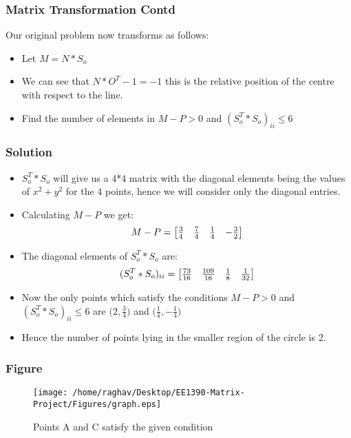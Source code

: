 \documentclass[xcolor=dvipsnames]{beamer}
\begin{document}
\begin{frame}
\frametitle{Matrix Transformation Contd}
Our original problem now transforms as follows:
\begin{itemize}
 \item<1-> Let $M = N*S_o$ 
 \item<2-> We can see that $N*O^{T} - 1 = -1$ this is the relative position of the centre with respect to the line.
 \item<3-> Find the number of elements in $M-P > 0$ and $(S_o^{T}*S_o)_{ii}\leqslant 6$
\end{itemize}

\end{frame}

\begin{frame}
\frametitle{Solution}
\begin{itemize}
 \item<1-> $S_o^{T}*S_o$ will give us a 4*4 matrix with the diagonal elements being the values of $x^{2} + y^{2}$ for the 4 points, hence we will consider only the diagonal entries. 
 \item<2-> Calculating $M-P$ we get:
 \[
 M-P =
\begin{bmatrix}
    $\(\frac{3}{4}\)$ & $\(\frac{7}{4}\)$ & $\(\frac{1}{4}\)$ & $\(-\frac{3}{2}\)$
\end{bmatrix}
\] 
 \item<3-> The diagonal elements of $S_o^{T}*S_o$ are:
  \[
 (S_o^{T}*S_o)_{ii} =
\begin{bmatrix}
    $\(\frac{73}{16}\)$ & $\(\frac{109}{16}\)$ & $\(\frac{1}{8}\)$ & $\(\frac{1}{32}\)$
\end{bmatrix}
\] 
\item<4-> Now the only points which satisfy the conditions $M-P > 0$ and $(S_o^{T}*S_o)_{ii}\leqslant 6$ are $\bigg(2,$\(\frac{3}{4}\)$\bigg)$ and $\bigg($\(\frac{1}{4}\)$,$\(-\frac{1}{4}\)$\bigg)$
\item<5->Hence the number of points lying in the smaller region of the circle is 2.
\end{itemize}

\end{frame}

\begin{frame}
\frametitle{Figure}
\begin{figure}[h]
\centering
\texttt{[image: /home/raghav/Desktop/EE1390-Matrix-Project/Figures/graph.eps]}
\caption{Points A and C satisfy the given condition}
\label{foobar-figure}
\end{figure}

\end{frame}
\end{document}
